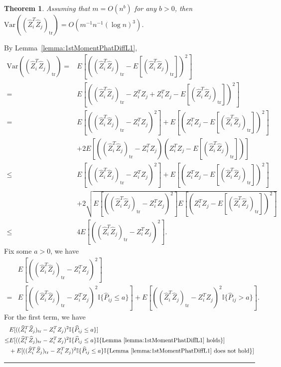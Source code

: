\documentclass[a4paper]{article}
\newenvironment{proof}{{\bf Proof:  }}{\hfill\rule{2mm}{2mm}}
\newtheorem{theorem}[fact]{Theorem}
\renewcommand{\hat}{\widehat}
\begin{document}
\begin{theorem}
\label{thm:VarASEL1proof}
Assuming that $m = O(n^b)$ for any $b > 0$, then $\mathrm{Var}((\hat{Z}_i^T \hat{Z}_j)_{\mathrm{tr}}) = O(m^{-1} n^{-1} (\log n)^3)$.
\end{theorem}
\begin{proof}
By Lemma~\ref{lemma:1stMomentPhatDiffL1},
\begin{align*}
	\mathrm{Var}((\hat{Z}_i^T \hat{Z}_j)_{\mathrm{tr}})
    = & E[((\hat{Z}_i^T \hat{Z}_j)_{\mathrm{tr}} - E[(\hat{Z}_i^T \hat{Z}_j)_{\mathrm{tr}}])^2] \\
    = & E[((\hat{Z}_i^T \hat{Z}_j)_{\mathrm{tr}} - Z_i^T Z_j + Z_i^T Z_j - E[(\hat{Z}_i^T \hat{Z}_j)_{\mathrm{tr}}])^2] \\
    = & E[((\hat{Z}_i^T \hat{Z}_j)_{\mathrm{tr}} - Z_i^T Z_j)^2] + E[(Z_i^T Z_j - E[(\hat{Z}_i^T \hat{Z}_j)_{\mathrm{tr}}])^2] \\ 
    & + 2E[((\hat{Z}_i^T \hat{Z}_j)_{\mathrm{tr}} - Z_i^T Z_j)(Z_i^T Z_j - E[(\hat{Z}_i^T \hat{Z}_j)_{\mathrm{tr}}])] \\
    \le & E[((\hat{Z}_i^T \hat{Z}_j)_{\mathrm{tr}} - Z_i^T Z_j)^2] + E[(Z_i^T Z_j - E[(\hat{Z}_i^T \hat{Z}_j)_{\mathrm{tr}}])^2] \\ 
    & + 2\sqrt{E[((\hat{Z}_i^T \hat{Z}_j)_{\mathrm{tr}} - Z_i^T Z_j)^2] E[(Z_i^T Z_j - E[(\hat{Z}_i^T \hat{Z}_j)_{\mathrm{tr}}])^2]} \\
    \le & 4 E[((\hat{Z}_i^T \hat{Z}_j)_{\mathrm{tr}} - Z_i^T Z_j)^2].
\end{align*}
Fix some $a > 0$, we have
\begin{align*}
	& E[((\hat{Z}_i^T \hat{Z}_j)_{\mathrm{tr}} - Z_i^T Z_j)^2] \\
	= & E[((\hat{Z}_i^T \hat{Z}_j)_{\mathrm{tr}} - Z_i^T Z_j)^2 \mathbb{I}\{\hat{P}_{ij} \le a\}]
	+ E[((\hat{Z}_i^T \hat{Z}_j)_{\mathrm{tr}} - Z_i^T Z_j)^2 \mathbb{I}\{\hat{P}_{ij} > a\}].
\end{align*}
For the first term, we have
\begin{align*}
	& E[((\hat{Z}_i^T \hat{Z}_j)_{\mathrm{tr}} - Z_i^T Z_j)^2 \mathbb{I}\{\hat{P}_{ij} \le a\}] \\
	\le & E[((\hat{Z}_i^T \hat{Z}_j)_{\mathrm{tr}} - Z_i^T Z_j)^2 \mathbb{I}\{\hat{P}_{ij} \le a\} \mathbb{I}\{\mathrm{Lemma\ } \ref{lemma:1stMomentPhatDiffL1} \mathrm{\ holds}\}] \\
	& + E[((\hat{Z}_i^T \hat{Z}_j)_{\mathrm{tr}} - Z_i^T Z_j)^2 \mathbb{I}\{\hat{P}_{ij} \le a\} \mathbb{I}\{\mathrm{Lemma\ } \ref{lemma:1stMomentPhatDiffL1} \mathrm{\ does\ not\ hold}\}] \\

\end{align*}
\end{proof}
\end{document}
